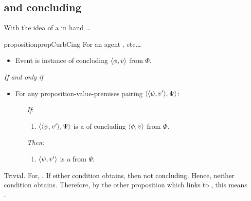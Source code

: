 \subsection{ and concluding}
\label{cha:zS:sec:question}

\begin{note}
  With the idea of a \curb{} in hand \dots

  \begin{restatable}{proposition}{propCurbCing}
    \label{prop:sCing}
    For an agent \vAgent{}, etc.\dots

    \begin{itemize}
    \item
      Event is instance of concluding \(\langle \phi, v \rangle\) from \(\Phi\).
    \end{itemize}

    \emph{If and only if}

    \begin{itemize}
    \item
      For any proposition-value-premises pairing \(\langle \langle \psi, v' \rangle, \Psi \rangle\):
      \begin{itemize}
      \item[\emph{If}:]
        \begin{enumerate}[label=\alph*., ref=(\alph*)]
        \item
          \label{question:zs:option}
          \(\langle \langle \psi, v' \rangle, \Psi \rangle\) is a \curb{} of concluding \(\langle \phi, v \rangle\) from \(\Phi\).
        \end{enumerate}
      \item[\emph{Then}:]
        \begin{enumerate}[label=\alph*., ref=(\alph*), resume]
        \item
          \label{question:zs:may-fail}
          \(\langle \psi, v' \rangle\) is a \fc{} from \(\Psi\).
        \end{enumerate}
      \end{itemize}
    \end{itemize}
    \begin{argument}
      Trivial.
      For, \curb{}.
      If either condition obtains, then not concluding.
      Hence, neither condition obtains.
      Therefore, by the other proposition which links to \fc{}, this means \fc{}.
    \end{argument}
  \end{restatable}
\end{note}

